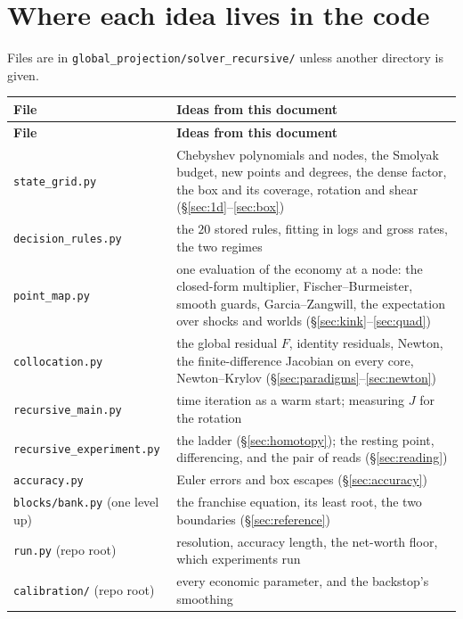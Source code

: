\documentclass[10pt,a4paper]{article}
\theoremstyle{plain}
\theoremstyle{remark}
\newcommand{\file}[1]{\textcolor{codecol}{\texttt{#1}}}
\begin{document}
\section{Where each idea lives in the code}

\noindent Files are in \file{global\_projection/solver\_recursive/} unless another directory is given.

\begin{center}\small
\begin{longtable}{@{}>{\raggedright\arraybackslash}p{}>{\raggedright\arraybackslash}p{}@{}}
\toprule
\textbf{File} & \textbf{Ideas from this document} \\
\midrule
\endfirsthead
\toprule
\textbf{File} & \textbf{Ideas from this document} \\
\midrule
\endhead
\file{state\_grid.py} & Chebyshev polynomials and nodes, the Smolyak budget, new points and
degrees, the dense factor, the box and its coverage, rotation and shear
(\S\ref{sec:1d}--\ref{sec:box}) \\
\file{decision\_rules.py} & the $20$ stored rules, fitting in logs and gross rates, the two regimes \\
\file{point\_map.py} & one evaluation of the economy at a node: the closed-form multiplier,
Fischer--Burmeister, smooth guards, Garcia--Zangwill, the expectation over shocks and worlds
(\S\ref{sec:kink}--\ref{sec:quad}) \\
\file{collocation.py} & the global residual $F$, identity residuals, Newton, the finite-difference
Jacobian on every core, Newton--Krylov (\S\ref{sec:paradigms}--\ref{sec:newton}) \\
\file{recursive\_main.py} & time iteration as a warm start; measuring $J$ for the rotation \\
\file{recursive\_experiment.py} & the ladder (\S\ref{sec:homotopy}); the resting point, differencing,
and the pair of reads (\S\ref{sec:reading}) \\
\file{accuracy.py} & Euler errors and box escapes (\S\ref{sec:accuracy}) \\
\file{blocks/bank.py} {\footnotesize(one level up)} & the franchise equation, its least root, the two
boundaries (\S\ref{sec:reference}) \\
\file{run.py} {\footnotesize(repo root)} & resolution, accuracy length, the net-worth floor, which
experiments run \\
\file{calibration/} {\footnotesize(repo root)} & every economic parameter, and the backstop's
smoothing \\
\bottomrule
\end{longtable}
\end{center}
\end{document}
